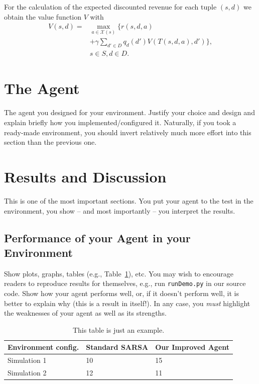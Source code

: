 \documentclass[journal, a4paper]{IEEEtran}
\theoremstyle{plain}
\theoremstyle{definition}
\begin{document}
For the calculation of the expected discounted revenue for each tuple $(s, d)$ we obtain the value function $V$ with\\
\begin{equation}
	\label{eq:ValueFunction}
	\begin{split}
		V(s,d) = &\max_{a \in \mathcal{X} (s)} \{ r(s, d, a)  \\
		&+ \gamma \sum_{d' \in D} q_d(d') V(T(s, d, a), d') \}, \\ 
		&s \in S, d \in D. 
	\end{split}
\end{equation}
\section{The Agent}

The agent you designed for your environment. Justify your choice and design and explain briefly how you implemented/configured it. Naturally, if you took a ready-made environment, you should invert relatively much more effort into this section than the previous one.

\section{Results and Discussion}

This is one of the most important sections. You put your agent to the test in the environment, you show -- and most importantly -- you interpret the results.

\subsection{Performance of your Agent in your Environment}

Show plots, graphs, tables (e.g., Table~\ref{a_table}), etc. You may wish to encourage readers to reproduce results for themselves, e.g., run \texttt{runDemo.py} in our source code. Show how your agent performs well, or, if it doesn't perform well, it is better to explain why (this is a result in itself!). In any case, you \emph{must} highlight the weaknesses of your agent as well as its strengths.

\begin{table}[h]
	\caption{\label{a_table}This table is just an example.}
	\centering
	\begin{tabular}{lll}
		\hline
		\textbf{Environment config.} & \textbf{Standard SARSA} & \textbf{Our Improved Agent}  \\
		\hline
		Simulation 1        & 10             & 15 \\
		Simulation 2        & 12             & 11 \\
		\hline
	\end{tabular}
\end{table}
\end{document}
